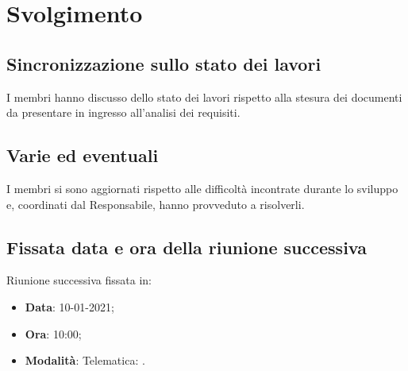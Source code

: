 \documentclass[]{article}
\begin{document}
	\newpage

	\section{Svolgimento}
		\subsection{Sincronizzazione sullo stato dei lavori}
		I membri hanno discusso dello stato dei lavori rispetto alla stesura dei documenti da presentare in ingresso all'analisi dei requisiti.\\
		
		\subsection{Varie ed eventuali}
		I membri si sono aggiornati rispetto alle difficoltà incontrate durante lo sviluppo e, coordinati dal Responsabile, hanno provveduto a risolverli.\\
		
		\subsection{Fissata data e ora della riunione successiva}
		Riunione successiva fissata in:
		\begin{itemize}
			\item \textbf{Data}: 10-01-2021;
			\item \textbf{Ora}: 10:00;
			\item \textbf{Modalità}: Telematica: .
		\end{itemize}
	
\end{document}
